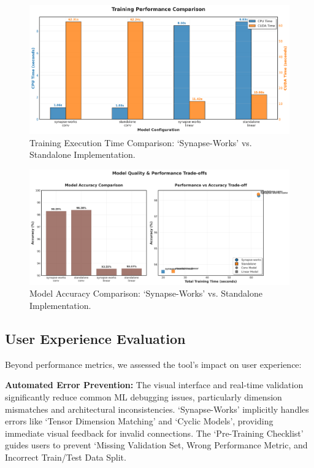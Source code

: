 \documentclass[10pt,conference]{IEEEtran}
\begin{document}
\begin{figure}[!htbp]
    \centering
    \includegraphics[width=1\linewidth]{1_performance_metrics.png}
    \caption{Training Execution Time Comparison: `Synapse-Works' vs. Standalone Implementation.}
    \label{fig:performance_metrics}
\end{figure}

\begin{figure}[!htbp]
    \centering
    \includegraphics[width=1\linewidth]{3_accuracy_quality.png}
    \caption{Model Accuracy Comparison: `Synapse-Works' vs. Standalone Implementation.}
    \label{fig:accuracy_quality}
\end{figure}

\subsection{User Experience Evaluation}
Beyond performance metrics, we assessed the tool's impact on user experience:

\textbf{Automated Error Prevention:} The visual interface and real-time validation significantly reduce common ML debugging issues, particularly dimension mismatches and architectural inconsistencies. `Synapse-Works' implicitly handles errors like `Tensor Dimension Matching' and `Cyclic Models', providing immediate visual feedback for invalid connections. The `Pre-Training Checklist' guides users to prevent `Missing Validation Set, Wrong Performance Metric, and Incorrect Train/Test Data Split.
\end{document}
